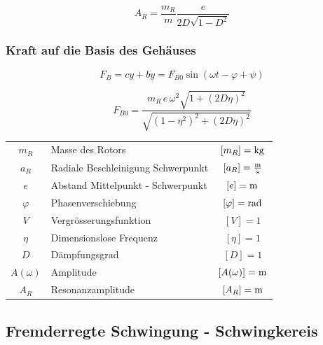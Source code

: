 $$ A_R = \frac{m_R}{m} \frac{e}{2D \sqrt{1 - D^2}}  $$




\subsubsection{Kraft auf die Basis des Gehäuses} 

\begin{minipage}{0.48\linewidth}
$$ F_B = c y + b \dot{y} = F_{B0} \sin(\omega t - \varphi + \psi) $$ 
\end{minipage}
\hfill
\begin{minipage}{0.48\linewidth}
$$\boxed{ F_{B0} = \frac{m_R \, e \, \omega^2 \sqrt{1+ (2D \eta)^2}}{\sqrt{(1 - \eta^2)^2 + (2 D \eta)^2}} } $$ 
\end{minipage}
\vspace{0.2cm}


\begin{tabular}{c l c}
$m_R$ & Masse des Rotors & $[m_R] = \mathrm{kg}$ \\
$a_R$ & Radiale Beschleinigung Schwerpunkt & $[a_R] = \frac{\mathrm{m}}{\mathrm{s}}$ \\
$e$ & Abstand Mittelpunkt - Schwerpunkt & $[e] = \mathrm{m}$ \\
$\varphi$ & Phasenverschiebung & $[ \varphi] = \mathrm{rad}$ \\
$V$ & Vergrösserungsfunktion & $[V] = 1$ \\
$\eta$ & Dimensionslose Frequenz & $[\eta] = 1$  \\
$D$ & Dämpfungsgrad & $[D] = 1$  \\
$A(\omega)$ & Amplitude & $[A(\omega)] = \mathrm{m}$ \\
$A_R$ & Resonanzamplitude & $[A_R] = \mathrm{m}$
\end{tabular}




\subsection{Fremderregte Schwingung - Schwingkereis}

